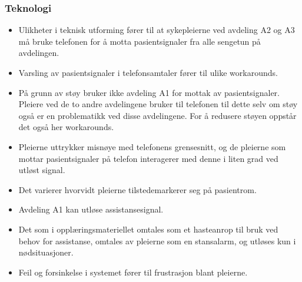 \subsubsection{Teknologi}
\begin{itemize}
\item Ulikheter i teknisk utforming fører til at sykepleierne ved avdeling A2 og A3 må bruke telefonen for å motta pasientsignaler fra alle sengetun på avdelingen.

\item Varsling av pasientsignaler i telefonsamtaler fører til ulike workarounds.

\item På grunn av støy bruker ikke avdeling A1 for mottak av pasientsignaler. Pleiere ved de to andre avdelingene bruker til telefonen til dette selv om støy også er en problematikk ved disse avdelingene. For å redusere støyen oppstår det også her workarounds.

\item Pleierne uttrykker misnøye med telefonens grensesnitt, og de pleierne som mottar pasientsignaler på telefon interagerer med denne i liten grad ved utløst signal.

\item Det varierer hvorvidt pleierne tilstedemarkerer seg på pasientrom.

\item Avdeling A1 kan utløse assistansesignal. 

\item Det som i opplæringsmateriellet omtales som et hasteanrop til bruk ved behov for assistanse, omtales av pleierne som en stansalarm, og utløses kun i nødsituasjoner.

\item Feil og forsinkelse i systemet fører til frustrasjon blant pleierne.

\end{itemize}

